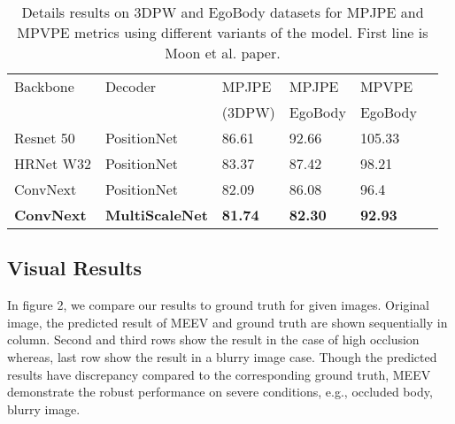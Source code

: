\documentclass[runningheads]{llncs}
\begin{document}
\setlength{\tabcolsep}{4pt}
\begin{table}
\begin{center}
\begin{tabular}{llllll}
\hline\noalign{\smallskip}
Backbone  & Decoder & MPJPE & MPJPE & MPVPE \\
  &  &(3DPW) & EgoBody & EgoBody \\
\noalign{\smallskip}
\hline
\noalign{\smallskip}
Resnet 50 \cite{resnet} &  PositionNet \cite{Moon_2022_CVPRW_Hand4Whole} & 86.61 & 92.66 & 105.33 \\
HRNet W32 \cite{hrnet} & PositionNet \cite{Moon_2022_CVPRW_Hand4Whole} & 83.37 & 87.42 & 98.21 \\
ConvNext \cite{liu2022convnet} &  PositionNet \cite{Moon_2022_CVPRW_Hand4Whole} & 82.09 & 86.08 & 96.4 \\
\textbf{ConvNext \cite{liu2022convnet} } & \textbf{MultiScaleNet} & \textbf{81.74} & \textbf{82.30} & \textbf{92.93} \\
\hline
\end{tabular}
\caption{Details results on 3DPW \cite{vonMarcard2018} and EgoBody \cite{Zhang:ECCV:2022} datasets for MPJPE and MPVPE metrics using different variants of the model. First line is Moon et al. \cite{Moon_2022_CVPRW_Hand4Whole} paper. }
\end{center}
\label{table:results}
\end{table}
\setlength{\tabcolsep}{1pt}


\subsection{Visual Results}

In figure 2, we compare our results to ground truth for given images. Original image, the predicted result of MEEV and ground truth are shown sequentially in column. Second and third rows show the result in the case of high occlusion whereas, last row show the result in a blurry image case. Though the predicted results have discrepancy compared to the corresponding ground truth, MEEV demonstrate the robust performance on severe conditions, e.g., occluded body, blurry image.
\end{document}
